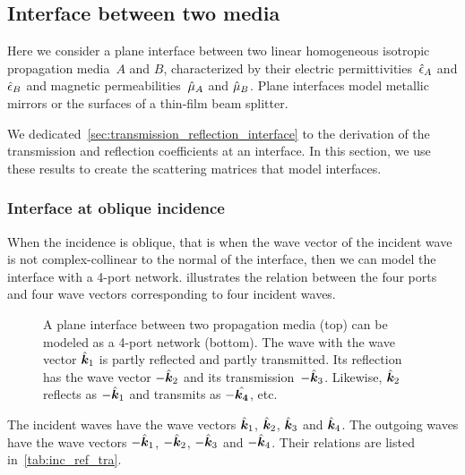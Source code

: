 
\subsection{Interface between two media}
\label{sec:interface_between_two_media}

Here we consider a plane interface between two linear homogeneous isotropic propagation media~$A$ and $B$, characterized by their electric permittivities~$\hat{\epsilon}_A$ and $\hat{\epsilon}_B$ and magnetic permeabilities~$\hat{\mu}_A$ and $\hat{\mu}_B$.
Plane interfaces model metallic mirrors or the surfaces of a thin-film beam splitter.

We dedicated~\cref{sec:transmission_reflection_interface} to the derivation of the transmission and reflection coefficients at an interface.
In this section, we use these results to create the scattering matrices that model interfaces.

\subsubsection{Interface at oblique incidence}
When the incidence is oblique, that is when the wave vector of the incident wave is not complex-collinear to the normal of the interface, then we can model the interface with a 4-port network.
 illustrates the relation between the four ports and four wave vectors corresponding to four incident waves.

\begin{figure}
    \centering
    
    \caption{A plane interface between two propagation media (top) can be modeled as a 4-port network (bottom).
    The wave with the wave vector $\hat{\bm{k}}_1$ is partly reflected and partly transmitted.
    Its reflection has the wave vector $-\hat{\bm{k}}_2$ and its transmission~$-\hat{\bm{k}}_3$.
    Likewise, $\hat{\bm{k}}_2$ reflects as $-\hat{\bm{k}}_1$ and transmits as $-\hat{\bm{k_4}}$, etc.
    }
    \label{fig:network_interface}
\end{figure}

The incident waves have the wave vectors
$\hat{\bm{k}}_1$, $\hat{\bm{k}}_2$, $\hat{\bm{k}}_3$ and $\hat{\bm{k}}_4$.
The outgoing waves have the wave vectors
$-\hat{\bm{k}}_1$, $-\hat{\bm{k}}_2$, $-\hat{\bm{k}}_3$ and $-\hat{\bm{k}}_4$.
Their relations are listed in~\cref{tab:inc_ref_tra}.

